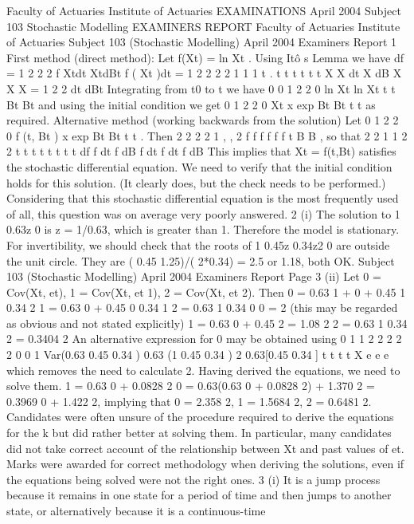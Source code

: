 Faculty of Actuaries Institute of Actuaries
EXAMINATIONS
April 2004
Subject 103 Stochastic Modelling
EXAMINERS REPORT
Faculty of Actuaries
Institute of Actuaries
Subject 103 (Stochastic Modelling) April 2004 Examiners Report
1 First method (direct method):
Let f(Xt) = ln Xt . Using Itô s Lemma we have
df = 1 2 2
2 f Xtdt XtdBt f ( Xt )dt
= 1 2 2
2 2
1 1 1
t . t t t
t t t
X X dt X dB
X X X
= 1 2
2 dt dBt
Integrating from t0 to t we have
0 0
1 2
2 0 ln Xt ln Xt t t Bt Bt
and using the initial condition we get
0
1 2
2 0 Xt x exp Bt Bt t t as required.
Alternative method (working backwards from the solution)
Let
0
1 2
2 0 f (t, Bt ) x exp Bt Bt t t . Then
2
2 2
2
1
, ,
2
f f f
f f f
t B B
, so that
2 2 1 1
2 2 t t t t t t t t df f dt f dB f dt f dt f dB
This implies that Xt = f(t,Bt) satisfies the stochastic differential equation.
We need to verify that the initial condition holds for this solution. (It clearly does, but
the check needs to be performed.)
Considering that this stochastic differential equation is the most frequently used of all,
this question was on average very poorly answered.
2 (i) The solution to 1 0.63z 0 is z = 1/0.63, which is greater than 1. Therefore
the model is stationary.
For invertibility, we should check that the roots of 1 0.45z 0.34z2 0 are
outside the unit circle. They are ( 0.45 1.25)/( 2*0.34) = 2.5 or 1.18, both
OK.
Subject 103 (Stochastic Modelling) April 2004 Examiners Report
Page 3
(ii) Let 0 = Cov(Xt, et), 1 = Cov(Xt, et 1), 2 = Cov(Xt, et 2). Then
0 = 0.63 1 + 0 + 0.45 1 0.34 2
1 = 0.63 0 + 0.45 0 0.34 1
2 = 0.63 1 0.34 0
0 = 2 (this may be regarded as obvious and not stated explicitly)
1 = 0.63 0 + 0.45 2 = 1.08 2
2 = 0.63 1 0.34 2 = 0.3404 2
An alternative expression for 0 may be obtained using
0 1 1 2
2 2 2 2
0 0 1
Var(0.63 0.45 0.34 )
0.63 (1 0.45 0.34 ) 2 0.63[0.45 0.34 ]
t t t t X e e e
which removes the need to calculate 2.
Having derived the equations, we need to solve them.
1 = 0.63 0 + 0.0828 2
0 = 0.63(0.63 0 + 0.0828 2) + 1.370 2 = 0.3969 0 + 1.422 2,
implying that
0 = 2.358 2, 1 = 1.5684 2, 2 = 0.6481 2.
Candidates were often unsure of the procedure required to derive the equations for the k but
did rather better at solving them. In particular, many candidates did not take correct
account of the relationship between Xt and past values of et. Marks were awarded for correct
methodology when deriving the solutions, even if the equations being solved were not the
right ones.
3 (i) It is a jump process because it remains in one state for a period of time and
then jumps to another state, or alternatively because it is a continuous-time
